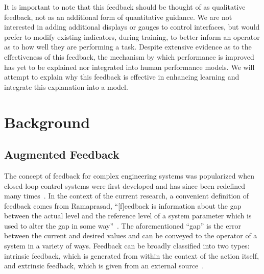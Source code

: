 It is important to note that this feedback should be thought of as qualitative feedback, not as an additional form of quantitative guidance.
We are not interested in adding additional displays or gauges to control interfaces, but would prefer to modify existing indicators, during training, to better inform an operator as to how well they are performing a task.
Despite extensive evidence as to the effectiveness of this feedback, the mechanism by which performance is improved has yet to be explained nor integrated into human performance models.
We will attempt to explain why this feedback is effective in enhancing learning and integrate this explanation into a model.

\section{Background}

\subsection{Augmented Feedback}

The concept of feedback for complex engineering systems was popularized when closed-loop control systems were first developed and has since been redefined many times~\citep{Wierner1948}.
In the context of the current research, a convenient definition of feedback comes from Ramaprasad, ``[f]eedback is information about the gap between the actual level and the reference level of a system parameter which is used to alter the gap in some way''~\citep{ramaprasad_definition_1983}.
The aforementioned ``gap'' is the error between the current and desired values and can be conveyed to the operator of a system in a variety of ways.
Feedback can be broadly classified into two types: intrinsic feedback, which is generated from within the context of the action itself, and extrinsic feedback, which is given from an external source~\citep{laurillard_rethinking_2002}.

